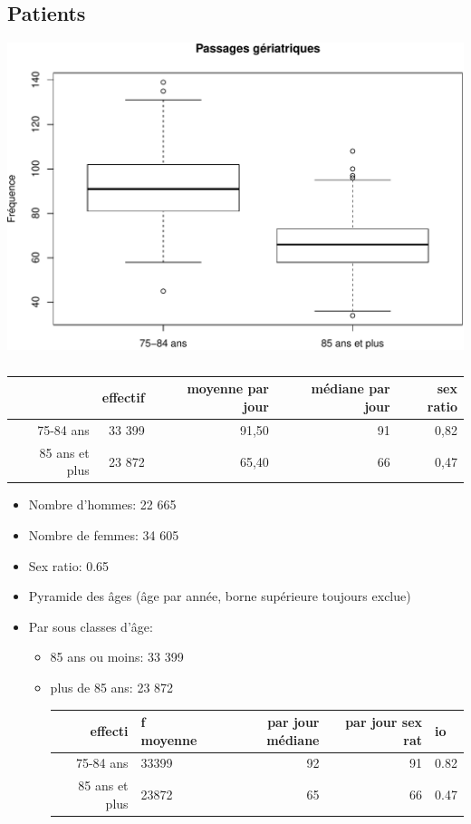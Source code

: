 \documentclass[]{article}
\begin{document}
\subsection{Patients}\label{patients-2}

\includegraphics{rapport2014_V4_files/figure-latex/sexe75-1.pdf}

\begin{table}[ht]
\centering
\begin{tabular}{rrrrr}
  \hline
 & effectif & moyenne par jour  & médiane par jour & sex ratio \\ 
  \hline
75-84 ans & 33 399 & 91,50 &  91 & 0,82 \\ 
  85 ans et plus & 23 872 & 65,40 &  66 & 0,47 \\ 
   \hline
\end{tabular}
\caption{} 
\end{table}

\begin{itemize}
\itemsep1pt\parskip0pt
\item
  Nombre d'hommes: 22 665
\item
  Nombre de femmes: 34 605
\item
  Sex ratio: 0.65
\item
  Pyramide des âges (âge par année, borne supérieure toujours exclue)
\item
  Par sous classes d'âge:

  \begin{itemize}
  \item
    85 ans ou moins: 33 399
  \item
    plus de 85 ans: 23 872

    \begin{longtable}[c]{@{}rlrrl@{}}
    \toprule
    effecti & f moyenne & par jour médiane & par jour sex rat &
    io\tabularnewline
    \midrule
    \endhead
    75-84 ans & 33399 & 92 & 91 & 0.82\tabularnewline
    85 ans et plus & 23872 & 65 & 66 & 0.47\tabularnewline
    \bottomrule
    \end{longtable}
  \end{itemize}
\end{itemize}
\end{document}

